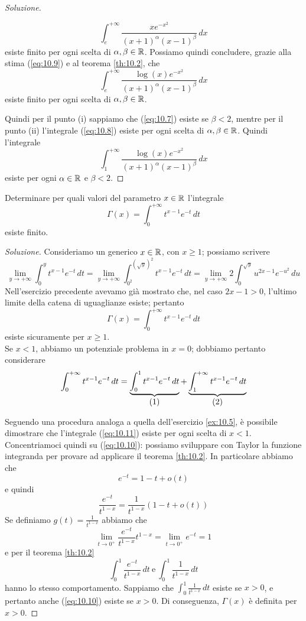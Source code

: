 \begin{proof}[Soluzione]
\begin{enumerate}[(i)]
        \[
        \int_e^{+\infty} \frac{xe^{-x^2}}{(x+1)^\alpha (x-1)^\beta}\, dx
        \]
        esiste finito per ogni scelta di $\alpha, \beta\in\amsbb{R}$. Possiamo quindi concludere, grazie alla stima (\ref{eq:10.9}) e al teorema \ref{th:10.2}, che
        \[
        \int_e^{+\infty} \frac{\log(x)e^{-x^2}}{(x+1)^\alpha (x-1)^\beta}\, dx
        \]
        esiste finito per ogni scelta di $\alpha, \beta\in\amsbb{R}$.
    \end{enumerate}
    Quindi per il punto (i) sappiamo che (\ref{eq:10.7}) esiste se $\beta<2$, mentre per il punto (ii) l'integrale (\ref{eq:10.8}) esiste per ogni scelta di $\alpha,\beta\in\amsbb{R}$. Quindi l'integrale
    \[
    \int_1^{+\infty}  \frac{\log(x)e^{-x^2}}{(x+1)^\alpha (x-1)^\beta}\, dx
    \]
    esiste per ogni $\alpha\in\amsbb{R}$ e $\beta<2$.
\end{proof}
\begin{exercise}
    \label{ex:10.6}
    Determinare per quali valori del parametro $x\in\amsbb{R}$ l'integrale
    \[
    \Gamma(x) = \int_0^{+\infty} t^{x-1} e^{-t}\, dt
    \]
    esiste finito.
\end{exercise}
\begin{proof}[Soluzione]
    
    Consideriamo un generico $x\in\amsbb{R}$, con $x\ge1$; possiamo scrivere
    \[
    \lim_{y\to +\infty} \int_0^{y} t^{x-1} e^{-t}\, dt = \lim_{y\to+\infty} \int_{0^2}^{(\sqrt{y})^2} t^{x-1}e^{-t}\, dt = \lim_{y\to +\infty} 2\int_0^{\sqrt{y}} u^{2x-1} e^{-u^2} \, du 
    \]
    Nell'esercizio precedente avevamo già mostrato che, nel caso $2x-1>0$, l'ultimo limite della catena di uguaglianze esiste; pertanto
    \[
    \Gamma(x) = \int_0^{+\infty} t^{x-1} e^{-t}\, dt
    \]
    esiste sicuramente per $x\ge 1$.\\
    Se $x<1$, abbiamo un potenziale problema in $x=0$; dobbiamo pertanto considerare
    \[
    \int_0^{+\infty} t^{x-1} e^{-t}\, dt = \underbrace{\int_0^1 t^{x-1}e^{-t}\, dt}_{\stepcounter{equation}\mbox{(\theequation)}} + \underbrace{\int_1^{+\infty}t^{x-1}e^{-t}\, dt}_{\stepcounter{equation}\mbox{(\theequation)}} 
    \]
    \addtocounter{equation}{-2}\label{eq:10.10}
    \addtocounter{equation}{0}\label{eq:10.11}
    Seguendo una procedura analoga a quella dell'esercizio \ref{ex:10.5}, è possibile dimostrare che l'integrale (\ref{eq:10.11}) esiste per ogni scelta di $x<1$. Concentriamoci quindi su (\ref{eq:10.10}): possiamo sviluppare con Taylor la funzione integranda per provare ad applicare il teorema \ref{th:10.2}. In particolare abbiamo che
    \[
    e^{-t} = 1-t +o(t)
    \]
    e quindi 
    \[
    \frac{e^{-t}}{t^{1-x}} = \frac{1}{t^{1-x}}(1-t+o(t))
    \]
    Se definiamo $g(t) = \frac{1}{t^{1-x}}$ abbiamo che
    \[
    \lim_{t\to 0^+} \frac{e^{-t}}{t^{1-x}}t^{1-x} = \lim_{t\to0^+} e^{-t} = 1
    \]
    e per il teorema \ref{th:10.2}
    \[
    \int_0^1 \frac{e^{-t}}{t^{1-x}}\, dt \ \text{e} \ \int_0^1 \frac{1}{t^{1-x}}\, dt
    \]
    hanno lo stesso comportamento. Sappiamo che $\int_0^1 \frac{1}{t^{1-x}}\, dt$ esiste se $x>0$, e pertanto anche (\ref{eq:10.10}) esiste se $x>0$. Di conseguenza, $\Gamma(x)$ è definita per $x>0$.
\end{proof}

